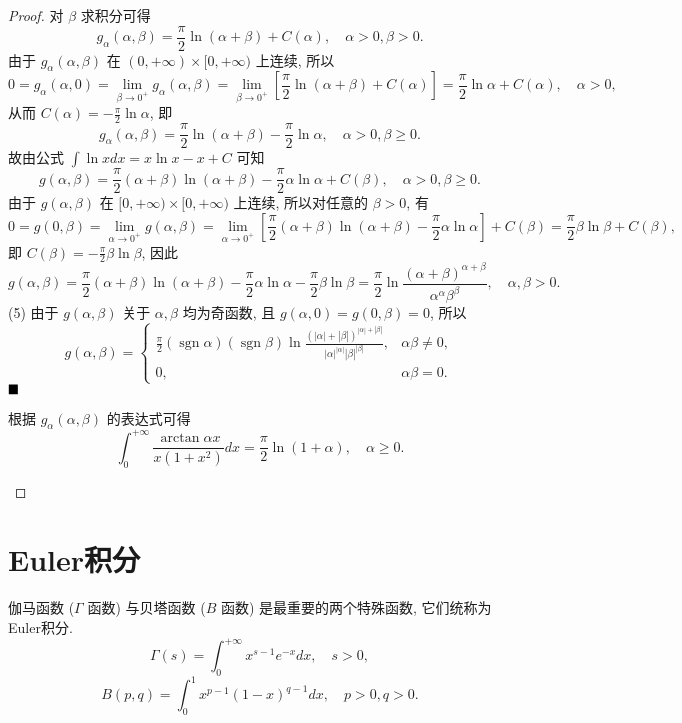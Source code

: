 \documentclass[lang=cn,newtx,10pt,scheme=chinese]{elegantbook}
\begin{document}
\begin{proof}
对 $\beta$ 求积分可得
$$ g_\alpha(\alpha, \beta) = \frac{\pi}{2} \ln(\alpha+\beta) + C(\alpha), \quad \alpha > 0, \beta > 0. $$
由于 $g_\alpha(\alpha, \beta)$ 在 $(0, +\infty) \times [0, +\infty)$ 上连续, 所以
$$ 0 = g_\alpha(\alpha, 0) = \lim\limits_{\beta \to 0^+} g_\alpha(\alpha, \beta) = \lim\limits_{\beta \to 0^+} \left[ \frac{\pi}{2}\ln(\alpha+\beta) + C(\alpha) \right] = \frac{\pi}{2}\ln\alpha + C(\alpha), \quad \alpha > 0, $$
从而 $C(\alpha) = -\frac{\pi}{2}\ln\alpha$, 即
$$ g_\alpha(\alpha, \beta) = \frac{\pi}{2}\ln(\alpha+\beta) - \frac{\pi}{2}\ln\alpha, \quad \alpha > 0, \beta \ge 0. $$
故由公式 $\int \ln x dx = x\ln x - x + C$ 可知
$$ g(\alpha, \beta) = \frac{\pi}{2}(\alpha+\beta)\ln(\alpha+\beta) - \frac{\pi}{2}\alpha\ln\alpha + C(\beta), \quad \alpha > 0, \beta \ge 0. $$
由于 $g(\alpha, \beta)$ 在 $[0, +\infty) \times [0, +\infty)$ 上连续, 所以对任意的 $\beta > 0$, 有
$$ 0 = g(0, \beta) = \lim\limits_{\alpha \to 0^+} g(\alpha, \beta) = \lim\limits_{\alpha \to 0^+} \left[ \frac{\pi}{2}(\alpha+\beta)\ln(\alpha+\beta) - \frac{\pi}{2}\alpha\ln\alpha \right] + C(\beta) = \frac{\pi}{2}\beta\ln\beta + C(\beta), $$
即 $C(\beta) = -\frac{\pi}{2}\beta\ln\beta$, 因此
$$ g(\alpha, \beta) = \frac{\pi}{2}(\alpha+\beta)\ln(\alpha+\beta) - \frac{\pi}{2}\alpha\ln\alpha - \frac{\pi}{2}\beta\ln\beta = \frac{\pi}{2}\ln\frac{(\alpha+\beta)^{\alpha+\beta}}{\alpha^\alpha\beta^\beta}, \quad \alpha, \beta > 0. $$
(5) 由于 $g(\alpha, \beta)$ 关于 $\alpha, \beta$ 均为奇函数, 且 $g(\alpha, 0)=g(0, \beta)=0$, 所以
$$ g(\alpha, \beta) = \begin{cases} \frac{\pi}{2}(\operatorname{sgn}\alpha)(\operatorname{sgn}\beta) \ln \frac{(|\alpha|+|\beta|)^{|\alpha|+|\beta|}}{|\alpha|^{|\alpha|}|\beta|^{|\beta|}}, & \alpha\beta \ne 0, \\ 0, & \alpha\beta=0. \end{cases} $$
$\hfill \blacksquare$

\begin{corollary*}
根据 $g_\alpha(\alpha, \beta)$ 的表达式可得
$$ \int_0^{+\infty} \frac{\arctan\alpha x}{x(1+x^2)} dx = \frac{\pi}{2}\ln(1+\alpha), \quad \alpha \ge 0. $$
\end{corollary*}

\end{proof}

\newpage
\section{Euler积分}
伽马函数 ($\Gamma$ 函数) 与贝塔函数 ($B$ 函数) 是最重要的两个特殊函数, 它们统称为Euler积分.
$$ \Gamma(s) = \int_{0}^{+\infty} x^{s-1}e^{-x} dx, \quad s > 0, $$
$$ B(p, q) = \int_{0}^{1} x^{p-1}(1-x)^{q-1} dx, \quad p > 0, q > 0. $$
\end{document}
